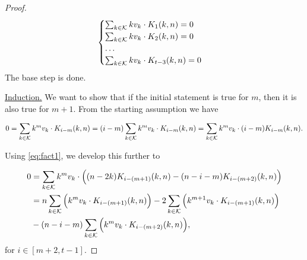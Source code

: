 \begin{proof}
    \begin{equation*}
        \begin{cases}
            \sum_{k \in \mathcal{K}} kv_k \cdot K_1(k, n) = 0\\
            \sum_{k \in \mathcal{K}} kv_k \cdot K_2(k, n) = 0\\
            \ldots\\
            \sum_{k \in \mathcal{K}} kv_k \cdot K_{t-3}(k, n) = 0\\
        \end{cases}
    \end{equation*}
    The base step is done.

    \underline{Induction.} We want to show that if the initial statement is true for $m$, then it is also true for $m+1$. From the starting assumption we have

    $$
    0 = \sum_{k \in \mathcal{K}} k^mv_k \cdot K_{i-m}(k, n) = (i-m)\sum_{k \in \mathcal{K}} k^mv_k \cdot K_{i-m}(k, n) = \sum_{k \in \mathcal{K}} k^mv_k \cdot (i-m)K_{i-m}(k, n).
    $$

    Using \cref{eq:fact1}, we develop this further to

    \begin{equation*}
    \begin{split}
        0 &= \sum_{k \in \mathcal{K}} k^mv_k \cdot \Big( (n - 2k)K_{i - (m+1)}(k, n) - (n - i - m)K_{i - (m + 2)}(k, n) \Big)\\
        & = n \sum_{k \in \mathcal{K}} \Big( k^mv_k \cdot K_{i - (m+1)}(k, n) \Big) - 2\sum_{k \in \mathcal{K}} \Big( k^{m+1}v_k \cdot K_{i - (m+1)}(k, n) \Big)\\& - (n - i - m)\sum_{k \in \mathcal{K}} \Big( k^mv_k \cdot K_{i - (m+2)}(k, n) \Big),
    \end{split}
    \end{equation*}
    for $i \in [m+2, t-1]$.


\end{proof}
